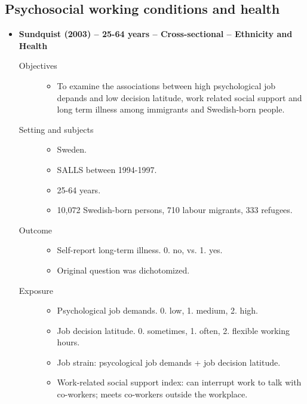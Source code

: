 \documentclass{article}
\begin{document}
\subsection{Psychosocial working conditions and health}
\begin{itemize}
	\item{\bf Sundquist (2003) -- 25-64 years -- Cross-sectional -- Ethnicity and Health} 
		\begin{description}
			\item[Objectives]\mbox{}\par
				\begin{itemize}
					\item To examine the associations between high psychological job depands and low decision latitude, work related social support and long term illness among immigrants and Swedish-born people.
				\end{itemize}
			\item[Setting and subjects]\mbox{}\par 
				\begin{itemize}
					\item Sweden. 
					\item SALLS between 1994-1997.
					\item 25-64 years.
					\item 10,072 Swedish-born persons, 710 labour migrants, 333 refugees.
				\end{itemize}
			\item[Outcome]\mbox{}\par
				\begin{itemize}
					\item Self-report long-term illness. 0. no, vs. 1. yes.
					\item Original question was dichotomized. 
				\end{itemize}
			\item[Exposure] \mbox{}\par
				\begin{itemize}
					\item Psychological job demands. 0. low, 1. medium, 2. high.
					\item Job decision latitude. 0. sometimes, 1. often, 2. flexible working hours.
					\item Job strain: psycological job demands + job decision latitude.
					\item Work-related social support index: can interrupt work to talk with co-workers; meets co-workers outside the workplace.

\end{itemize}
\end{description}
\end{itemize}
\end{document}
